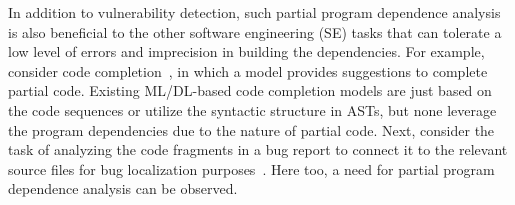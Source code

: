 In addition to vulnerability detection, such partial program dependence analysis is also beneficial to the other software engineering (SE) tasks that can tolerate a low level of errors and imprecision in building the dependencies. For example, consider code completion~\cite{codefill-icse22,facebook-icse21}, in which a model provides suggestions to complete partial code. Existing ML/DL-based code completion models are just based on the code sequences or utilize the syntactic structure in ASTs, but none leverage the program dependencies due to the nature of partial code. Next, consider the task of analyzing the code fragments in a bug report to connect it to the relevant source files for bug localization purposes~\cite{euler-fse19,icpc17}. Here too, a need for partial program dependence analysis can be observed.
